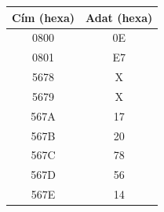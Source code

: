 \documentclass{article}
\begin{document}
\begin{center}
\begin{tabular}{ |c|c| } 
 \hline
 Cím (hexa) & Adat (hexa) \\ \hline
 0800 & 0E \\ \hline
 0801 & E7 \\ \hline
 5678 & X \\ \hline
 5679 & X \\ \hline
 567A & 17 \\ \hline
 567B & 20 \\ \hline
 567C & 78 \\ \hline
 567D & 56 \\ \hline
 567E & 14 \\ \hline
 \hline
\end{tabular}
\end{center}
\end{document}
